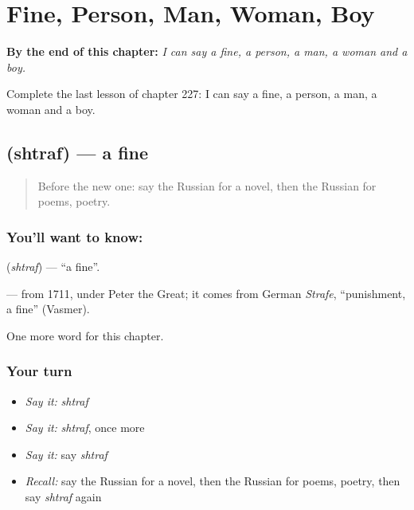 
\chapter{Fine, Person, Man, Woman, Boy}
\label{ch:ru-fine-person-man-woman-boy}

\begin{chapteropening}
\textbf{By the end of this chapter:} \emph{I can say a fine, a person, a man, a woman and a boy.}

Complete the last lesson of chapter 227: I can say a fine, a person, a man, a woman and a boy.
\end{chapteropening}

\section[\texorpdfstring{\ru{штраф} (shtraf)}{штраф (shtraf)}]{ (shtraf) — a fine}

\label{lesson:RU-C227-shtraf}



\begin{quote}
Before the new one: say the Russian for a novel, then the Russian for poems, poetry.
\end{quote}

\subsection*{You'll want to know: }
\textbf{} (\emph{shtraf}) — \textquotedblleft{}a fine\textquotedblright{}.

\begin{cousinweb}
\textbf{} — from 1711, under Peter the Great; it comes from German \emph{Strafe}, \textquotedblleft{}punishment, a fine\textquotedblright{} (Vasmer).
\end{cousinweb}

\begin{grammarlens}[title={What you've built}]
One more word for this chapter.
\end{grammarlens}

\subsection*{Your turn}
\begin{itemize}
\raggedright
  \item \emph{Say it:} \emph{shtraf}
  \item \emph{Say it:} \emph{shtraf}, once more
  \item \emph{Say it:} say \emph{shtraf}
  \item \emph{Recall:} say the Russian for a novel, then the Russian for poems, poetry, then say \emph{shtraf} again
\end{itemize}

